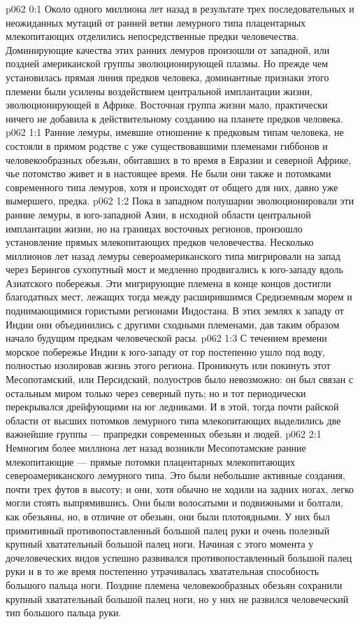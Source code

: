 \vs p062 0:1 Около одного миллиона лет назад в результате трех последовательных и неожиданных мутаций от ранней ветви лемурного типа плацентарных млекопитающих отделились непосредственные предки человечества. Доминирующие качества этих ранних лемуров произошли от западной, или поздней американской группы эволюционирующей плазмы. Но прежде чем установилась прямая линия предков человека, доминантные признаки этого племени были усилены воздействием центральной имплантации жизни, эволюционирующей в Африке. Восточная группа жизни мало, практически ничего не добавила к действительному созданию на планете предков человека.
\vs p062 1:1 Ранние лемуры, имевшие отношение к предковым типам человека, не состояли в прямом родстве с уже существовавшими племенами гиббонов и человекообразных обезьян, обитавших в то время в Евразии и северной Африке, чье потомство живет и в настоящее время. Не были они также и потомками современного типа лемуров, хотя и происходят от общего для них, давно уже вымершего, предка.
\vs p062 1:2 Пока в западном полушарии эволюционировали эти ранние лемуры, в юго\hyp{}западной Азии, в исходной области центральной имплантации жизни, но на границах восточных регионов, произошло установление прямых млекопитающих предков человечества. Несколько миллионов лет назад лемуры североамериканского типа мигрировали на запад через Берингов сухопутный мост и медленно продвигались к юго\hyp{}западу вдоль Азиатского побережья. Эти мигрирующие племена в конце концов достигли благодатных мест, лежащих тогда между расширившимся Средиземным морем и поднимающимися гористыми регионами Индостана. В этих землях к западу от Индии они объединились с другими сходными племенами, дав таким образом начало будущим предкам человеческой расы.
\vs p062 1:3 С течением времени морское побережье Индии к юго\hyp{}западу от гор постепенно ушло под воду, полностью изолировав жизнь этого региона. Проникнуть или покинуть этот Месопотамский, или Персидский, полуостров было невозможно: он был связан с остальным миром только через северный путь; но и тот периодически перекрывался дрейфующими на юг ледниками. И в этой, тогда почти райской области от высших потомков лемурного типа млекопитающих выделились две важнейшие группы --- прапредки современных обезьян и людей.
\vs p062 2:1 Немногим более миллиона лет назад  возникли Месопотамские ранние млекопитающие --- прямые потомки плацентарных млекопитающих североамериканского лемурного типа. Это были небольшие активные создания, почти трех футов в высоту; и они, хотя обычно не ходили на задних ногах, легко могли стоять выпрямившись. Они были волосатыми и подвижными и болтали, как обезьяны, но, в отличие от обезьян, они были плотоядными. У них был примитивный противопоставленный большой палец руки и очень полезный крупный хватательный большой палец ноги. Начиная с этого момента у дочеловеческих видов успешно развивался противопоставленный большой палец руки и в то же время постепенно утрачивалась хватательная способность большого пальца ноги. Поздние племена человекообразных обезьян сохранили крупный хватательный большой палец ноги, но у них не развился человеческий тип большого пальца руки.
